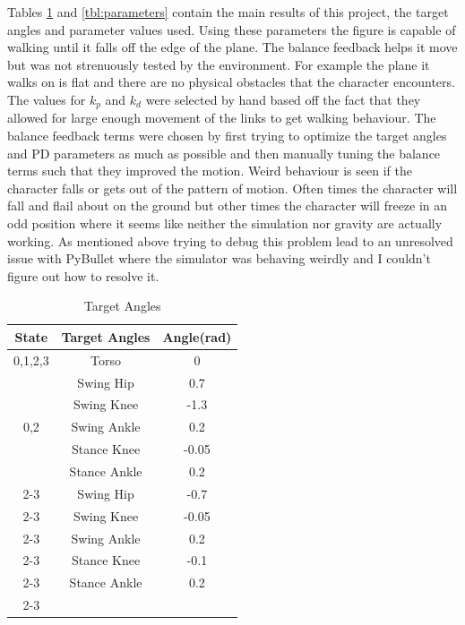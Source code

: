 \documentclass[12pt, a4paper]{article}
\begin{document}
Tables \ref{tbl: target angles} and \ref{tbl:parameters} contain the main results of this project, the target angles and parameter values used. Using these parameters the figure is capable of walking until it falls off the edge of the plane. The balance feedback helps it move but was not strenuously tested by the environment. For example the plane it walks on is flat and there are no physical obstacles that the character encounters. The values for $k_p$ and $k_d$ were selected by hand based off the fact that they allowed for large enough movement of the links to get walking behaviour. The balance feedback terms were chosen by first trying to optimize the target angles and PD parameters as much as possible and then manually tuning the balance terms such that they improved the motion. Weird behaviour is seen if the character falls or gets out of the pattern of motion. Often times the character will fall and flail about on the ground but other times the character will freeze in an odd position where it seems like neither the simulation nor gravity are actually working. As mentioned above trying to debug this problem lead to an unresolved issue with PyBullet where the simulator was behaving weirdly and I couldn't figure out how to resolve it. 
\begin{table}[ht]
\caption{Target Angles}
\begin{center}
\begin{tabular}{|c|c|c|}
\hline
State & Target Angles & Angle(rad) \\
\hline
0,1,2,3 & Torso & 0\\
\hline
\multirow{5}{*}{0,2}&Swing Hip & 0.7\\\cline{2-3}
& Swing Knee & -1.3\\ \cline{2-3}
& Swing Ankle & 0.2\\\cline{2-3}
& Stance Knee& -0.05\\\cline{2-3}
&Stance Ankle & 0.2\\\cline{2-3}
\hline
\multirow{5}{*}{1,3}&Swing Hip & -0.7\\\cline{2-3}
& Swing Knee & -0.05\\ \cline{2-3}
& Swing Ankle & 0.2\\\cline{2-3}
& Stance Knee& -0.1\\\cline{2-3}
&Stance Ankle & 0.2\\\cline{2-3}
\hline
\end{tabular}
\end{center}
\label{tbl: target angles}
\end{table}
\end{document}

